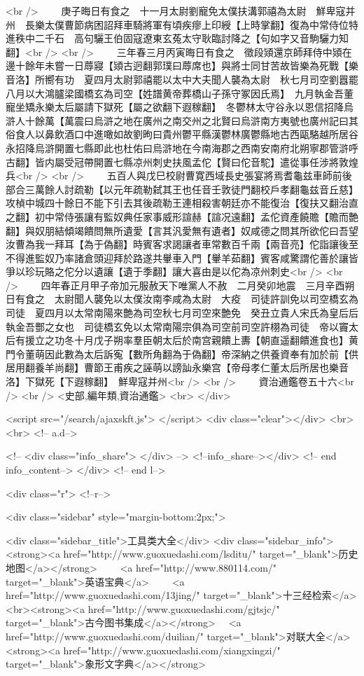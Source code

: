 <br />
　　庚子晦日有食之　十一月太尉劉寵免太僕扶溝郭禧為太尉　鮮卑寇并州　長樂太僕曹節病困詔拜車騎將軍有頃疾瘳上印綬【上時掌翻】復為中常侍位特進秩中二千石　高句驪王伯固寇遼東玄菟太守耿臨討降之【句如字又音駒驪力知翻】<br />
<br />
　　三年春三月丙寅晦日有食之　徵段熲還京師拜侍中熲在邊十餘年未嘗一日蓐寢【熲古迥翻郭璞曰蓐席也】與將士同甘苦故皆樂為死戰【樂音洛】所嚮有功　夏四月太尉郭禧罷以太中大夫聞人襲為太尉　秋七月司空劉囂罷八月以大鴻臚梁國橋玄為司空【姓譜黄帝葬橋山子孫守冢因氏焉】　九月執金吾董寵坐矯永樂太后屬請下獄死【屬之欲翻下遐稼翻】　冬鬱林太守谷永以恩信招降烏滸人十餘萬【萬震曰烏滸之地在廣州之南交州之北賢曰烏滸南方夷號也廣州記曰其俗食人以鼻飲酒口中進噉如故劉昫曰貴州鬱平縣漢鬱林廣鬱縣地古西甌駱越所居谷永招降烏滸開置七縣即此也杜佑曰烏滸地在今南海郡之西南安南府北朔寧郡管滸呼古翻】皆内屬受冠帶開置七縣凉州刺史扶風孟佗【賢曰佗音駝】遣從事任涉將敦煌兵<br />
<br />
　　五百人與戊巳校尉曹寛西域長史張宴將焉耆龜兹車師前後部合三萬餘人討疏勒【以元年疏勒弑其王也任音壬敦徒門翻校戶孝翻龜兹音丘慈】攻楨中城四十餘日不能下引去其後疏勒王連相殺害朝廷亦不能復治【復扶又翻治直之翻】初中常侍張讓有監奴典任家事威形諠赫【諠况遠翻】孟佗資產饒贍【贍而艶翻】與奴朋結傾竭饋問無所遺愛【言其汎愛無有遺者】奴咸德之問其所欲佗曰吾望汝曹為我一拜耳【為于偽翻】時賓客求謁讓者車常數百千兩【兩音亮】佗詣讓後至不得進監奴乃率諸倉頭迎拜於路遂共轝車入門【轝羊茹翻】賓客咸驚謂佗善於讓皆爭以珍玩賂之佗分以遺讓【遺于季翻】讓大喜由是以佗為凉州刺史<br />
<br />
　　四年春正月甲子帝加元服赦天下唯黨人不赦　二月癸卯地震　三月辛酉朔日有食之　太尉聞人襲免以太僕汝南李咸為太尉　大疫　司徒許訓免以司空橋玄為司徒　夏四月以太常南陽來艶為司空秋七月司空來艶免　癸丑立貴人宋氏為皇后后執金吾酆之女也　司徒橋玄免以太常南陽宗俱為司空前司空許栩為司徒　帝以竇太后有援立之功冬十月戊子朔率羣臣朝太后於南宫親饋上夀【朝直遥翻饋進食也】黄門令董萌因此數為太后訴寃【數所角翻為于偽翻】帝深納之供養資奉有加於前【供居用翻養羊尚翻】曹節王甫疾之誣萌以謗訕永樂宫【帝母孝仁董太后所居也樂音洛】下獄死【下遐稼翻】　鮮卑寇并州<br />
<br />
　　資治通鑑卷五十六<br />
<br />
<史部,編年類,資治通鑑>  <br>
   </div> 

<script src="/search/ajaxskft.js"> </script>
 <div class="clear"></div>
<br>
<br>
 <!-- a.d-->

 <!--
<div class="info_share">
</div> 
-->
 <!--info_share--></div>   <!-- end info_content-->
  </div> <!-- end l-->

<div class="r">   <!--r-->



<div class="sidebar"  style="margin-bottom:2px;">

 
<div class="sidebar_title">工具类大全</div>
<div class="sidebar_info">
<strong><a href="http://www.guoxuedashi.com/lsditu/" target="_blank">历史地图</a></strong>　　
<a href="http://www.880114.com/" target="_blank">英语宝典</a>　　
<a href="http://www.guoxuedashi.com/13jing/" target="_blank">十三经检索</a>　
<br><strong><a href="http://www.guoxuedashi.com/gjtsjc/" target="_blank">古今图书集成</a></strong>　
<a href="http://www.guoxuedashi.com/duilian/" target="_blank">对联大全</a>　<strong><a href="http://www.guoxuedashi.com/xiangxingzi/" target="_blank">象形文字典</a></strong>　

